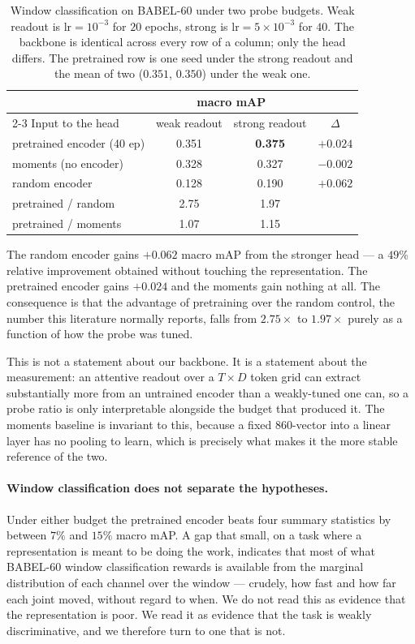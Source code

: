 \begin{table}[t]
\centering
\small
\begin{tabular}{lccc}
\toprule
& \multicolumn{2}{c}{macro mAP} & \\
\cmidrule(lr){2-3}
Input to the head & weak readout & strong readout & $\Delta$ \\
\midrule
pretrained encoder (40 ep) & 0.351 & \textbf{0.375} & $+0.024$ \\
moments (no encoder)       & 0.328 & 0.327 & $-0.002$ \\
random encoder             & 0.128 & 0.190 & $+0.062$ \\
\midrule
pretrained / random        & 2.75  & 1.97  & \\
pretrained / moments       & 1.07  & 1.15  & \\
\bottomrule
\end{tabular}
\caption{Window classification on BABEL-60 under two probe budgets. Weak readout is
$\text{lr}=10^{-3}$ for $20$ epochs, strong is $\text{lr}=5\times10^{-3}$ for $40$.
The backbone is identical across every row of a column; only the head differs. The
pretrained row is one seed under the strong readout and the mean of two ($0.351$,
$0.350$) under the weak one.}
\label{tab:budget}
\end{table}

The random encoder gains $+0.062$ macro mAP from the stronger head --- a $49\%$ relative
improvement obtained without touching the representation. The pretrained encoder gains
$+0.024$ and the moments gain nothing at all. The consequence is that the advantage of
pretraining over the random control, the number this literature normally reports, falls
from $2.75\times$ to $1.97\times$ purely as a function of how the probe was tuned.

This is not a statement about our backbone. It is a statement about the measurement: an
attentive readout over a $T \times D$ token grid can extract substantially more from an
untrained encoder than a weakly-tuned one can, so a probe ratio is only interpretable
alongside the budget that produced it. The moments baseline is invariant to this,
because a fixed $860$-vector into a linear layer has no pooling to learn, which is
precisely what makes it the more stable reference of the two.

\paragraph{Window classification does not separate the hypotheses.}
Under either budget the pretrained encoder beats four summary statistics by between
$7\%$ and $15\%$ macro mAP. A gap that small, on a task where a representation is meant
to be doing the work, indicates that most of what BABEL-60 window classification
rewards is available from the marginal distribution of each channel over the window ---
crudely, how fast and how far each joint moved, without regard to when. We do not read
this as evidence that the representation is poor. We read it as evidence that the task
is weakly discriminative, and we therefore turn to one that is not.

